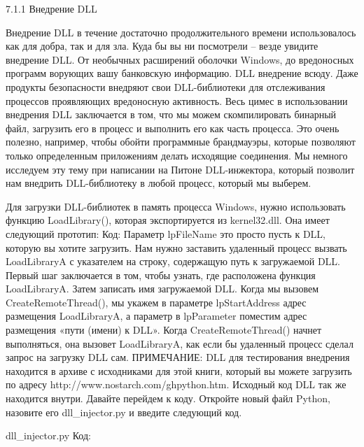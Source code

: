 \documentclass[12pt, a4paper, oneside]{book}
\begin{document}
7.1.1 Внедрение DLL

Внедрение DLL в течение достаточно продолжительного времени использовалось как для добра, так и для зла. Куда бы вы ни посмотрели – везде увидите внедрение DLL. От необычных расширений оболочки Windows, до вредоносных программ ворующих вашу банковскую информацию. DLL внедрение всюду. Даже продукты безопасности внедряют свои DLL-библиотеки для отслеживания процессов проявляющих вредоносную активность. Весь цимес в использовании внедрения DLL заключается в том, что мы можем скомпилировать бинарный файл, загрузить его в процесс и выполнить его как часть процесса. Это очень полезно, например, чтобы обойти программные брандмауэры, которые позволяют только определенным приложениям делать исходящие соединения. Мы немного исследуем эту тему при написании на Питоне DLL-инжектора, который позволит нам внедрить DLL-библиотеку в любой процесс, который мы выберем.

Для загрузки DLL-библиотек в память процесса Windows, нужно использовать функцию LoadLibrary(), которая экспортируется из kernel32.dll. Она имеет следующий прототип:
Код:
Параметр lpFileName это просто пусть к DLL, которую вы хотите загрузить. Нам нужно заставить удаленный процесс вызвать LoadLibraryA с указателем на строку, содержащую путь к загружаемой DLL. Первый шаг заключается в том, чтобы узнать, где расположена функция LoadLibraryA. Затем записать имя загружаемой DLL. Когда мы вызовем CreateRemoteThread(), мы укажем в параметре lpStartAddress адрес размещения LoadLibraryA, а параметр в lpParameter поместим адрес размещения «пути (имени) к DLL». Когда CreateRemoteThread() начнет выполняться, она вызовет LoadLibraryA, как если бы удаленный процесс сделал запрос на загрузку DLL сам.
ПРИМЕЧАНИЕ: DLL для тестирования внедрения находится в архиве с исходниками для этой книги, который вы можете загрузить по адресу http://www.nostarch.com/ghpython.htm. Исходный код DLL так же находится внутри.
Давайте перейдем к коду. Откройте новый файл Python, назовите его dll\_injector.py и введите следующий код.

dll\_injector.py
Код:



\end{document}
